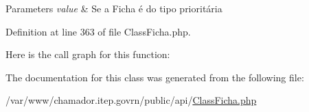 \begin{DoxyParams}{Parameters}
{\em value} & Se a Ficha é do tipo prioritária \\
\hline
\end{DoxyParams}


Definition at line 363 of file Class\+Ficha.\+php.

Here is the call graph for this function\+:


The documentation for this class was generated from the following file\+:\begin{DoxyCompactItemize}
\item 
/var/www/chamador.\+itep.\+govrn/public/api/\hyperlink{_class_ficha_8php}{Class\+Ficha.\+php}\end{DoxyCompactItemize}
